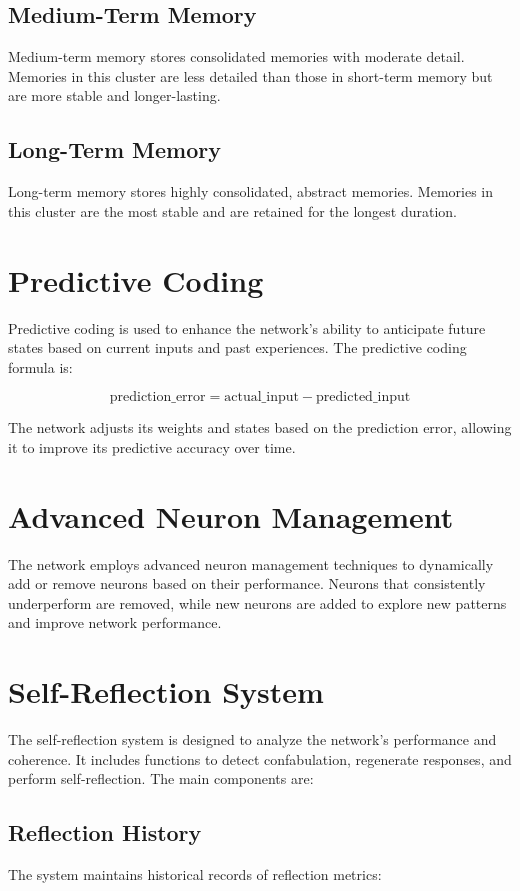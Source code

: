\documentclass{article}
\begin{document}
\subsection{Medium-Term Memory}
Medium-term memory stores consolidated memories with moderate detail. Memories in this cluster are less detailed than those in short-term memory but are more stable and longer-lasting.

\subsection{Long-Term Memory}
Long-term memory stores highly consolidated, abstract memories. Memories in this cluster are the most stable and are retained for the longest duration.

\section{Predictive Coding}
Predictive coding is used to enhance the network's ability to anticipate future states based on current inputs and past experiences. The predictive coding formula is:

\[
\text{prediction\_error} = \text{actual\_input} - \text{predicted\_input}
\]

The network adjusts its weights and states based on the prediction error, allowing it to improve its predictive accuracy over time.

\section{Advanced Neuron Management}
The network employs advanced neuron management techniques to dynamically add or remove neurons based on their performance. Neurons that consistently underperform are removed, while new neurons are added to explore new patterns and improve network performance.

\section{Self-Reflection System}
The self-reflection system is designed to analyze the network's performance and coherence. It includes functions to detect confabulation, regenerate responses, and perform self-reflection. The main components are:

\subsection{Reflection History}
The system maintains historical records of reflection metrics:
\end{document}
